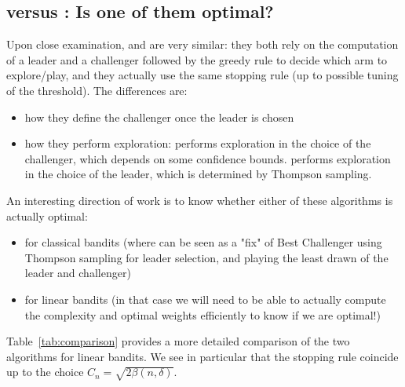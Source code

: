 \subsection{\texorpdfstring{\LGapE}{} versus \texorpdfstring{\LTCCG}{}: Is one of them optimal?}

Upon close examination, \LGapE and \LTCCG are very similar: they both rely on the computation of a leader and a challenger followed by the greedy rule to decide which arm to explore/play, and they actually use the same stopping rule (up to possible tuning of the threshold). The differences are:
\begin{itemize}
    \item how they define the challenger once the leader is chosen 
    \item how they perform exploration: \LGapE performs exploration in the choice of the challenger, which depends on some confidence bounds.  \LTCCG performs exploration in the choice of the leader, which is determined by Thompson sampling.  
\end{itemize}
An interesting direction of work is to know whether either of these algorithms is actually optimal:
\begin{itemize}
    \item for classical bandits (where \LTCCG can be seen as a "fix" of Best Challenger using Thompson sampling for leader selection, and playing the least drawn of the leader and challenger) 
    \item for linear bandits (in that case we will need to be able to actually compute the complexity and optimal weights efficiently to know if we are optimal!)
\end{itemize}

\medskip

Table~\ref{tab:comparison} provides a more detailed comparison of the two algorithms for linear bandits. We see in particular that the stopping rule coincide up to the choice $C_n = \sqrt{2\beta(n, \delta)}$.


